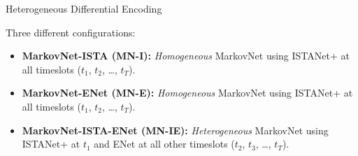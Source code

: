 \documentclass{beamer}
\begin{document}
  \begin{frame}{Heterogeneous Differential Encoding}
    \footnotesize{
    Three different configurations:
    \begin{itemize}
      \item \textbf{MarkovNet-ISTA (MN-I):} \emph{Homogeneous} MarkovNet using ISTANet+ at all timeslots ($t_1$, $t_2$, \dots, $t_T$). 
      \item \textbf{MarkovNet-ENet (MN-E):} \emph{Homogeneous} MarkovNet using ISTANet+ at all timeslots ($t_1$, $t_2$, \dots, $t_T$).
      \item \textbf{MarkovNet-ISTA-ENet (MN-IE):} \emph{Heterogeneous} MarkovNet using ISTANet+ at $t_1$ and ENet at all other timeslots ($t_2$, $t_3$, \dots, $t_T$). 
    \end{itemize}
    }
  \end{frame}

\end{document}
